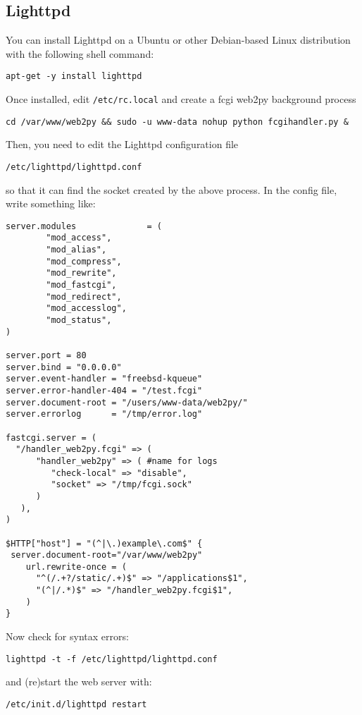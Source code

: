 \documentclass[justified,sixbynine,notoc]{tufte-book}
\def\ft{\small\tt}
\def\inxx#1{\index{#1}}
\begin{document}
\begin{fullwidth}
\goodbreak\subsection{Lighttpd}

\inxx{Lighttpd} \inxx{FastCGI} \inxx{fcgihandler}

You can install Lighttpd on a Ubuntu or other Debian-based Linux distribution with the following shell command:
\begin{lstlisting}
apt-get -y install lighttpd
\end{lstlisting}

Once installed, edit {\ft /etc/rc.local} and create a fcgi web2py background process
\begin{lstlisting}
cd /var/www/web2py && sudo -u www-data nohup python fcgihandler.py &
\end{lstlisting}

Then, you need to edit the Lighttpd configuration file
\begin{lstlisting}
/etc/lighttpd/lighttpd.conf
\end{lstlisting}
\noindent so that it can find the socket created by the above process. In the config file, write something like:
\begin{lstlisting}
server.modules              = (
        "mod_access",
        "mod_alias",
        "mod_compress",
        "mod_rewrite",
        "mod_fastcgi",
        "mod_redirect",
        "mod_accesslog",
        "mod_status",
)

server.port = 80
server.bind = "0.0.0.0"
server.event-handler = "freebsd-kqueue"
server.error-handler-404 = "/test.fcgi"
server.document-root = "/users/www-data/web2py/"
server.errorlog      = "/tmp/error.log"

fastcgi.server = (
  "/handler_web2py.fcgi" => (
      "handler_web2py" => ( #name for logs
         "check-local" => "disable",
         "socket" => "/tmp/fcgi.sock"
      )
   ),
)

$HTTP["host"] = "(^|\.)example\.com$" {
 server.document-root="/var/www/web2py"
    url.rewrite-once = (
      "^(/.+?/static/.+)$" => "/applications$1",
      "(^|/.*)$" => "/handler_web2py.fcgi$1",
    )
}
\end{lstlisting}

Now check for syntax errors:
\begin{lstlisting}
lighttpd -t -f /etc/lighttpd/lighttpd.conf
\end{lstlisting}
\noindent and (re)start the web server with:
\begin{lstlisting}
/etc/init.d/lighttpd restart
\end{lstlisting}


\end{fullwidth}
\end{document}
